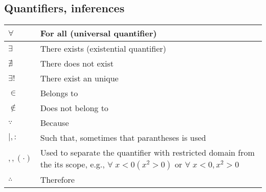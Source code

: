 \documentclass{article}
\begin{document}
\subsection{Quantifiers, inferences}
\begin{xltabular}{\textwidth}{XX}
    \(\forall\) & For all (universal quantifier) \cite{grahamConcreteMathematicsFoundation1989}\\ \hline
    \(\exists\) & There exists (existential quantifier) \cite{grahamConcreteMathematicsFoundation1989}\\ \hline
    \(\nexists\) & There does not exist \cite{grahamConcreteMathematicsFoundation1989}\\ \hline
    \(\exists!\) & There exist an unique \cite{grahamConcreteMathematicsFoundation1989}\\ \hline
    \(\in\) & Belongs to \cite{grahamConcreteMathematicsFoundation1989}\\ \hline
    \(\not\in\) & Does not belong to \cite{grahamConcreteMathematicsFoundation1989}\\ \hline
    \(\because\) & Because \cite{grahamConcreteMathematicsFoundation1989}\\ \hline
    \(\mid, :\) & Such that, sometimes that parantheses is used \cite{grahamConcreteMathematicsFoundation1989}\\ \hline
    \(, , \left( \cdot \right)\) & Used to separate the quantifier with restricted domain from the its scope, e.g., \(\forall \; x < 0 \left( x^{2} > 0 \right)\) or \(\forall \; x < 0, x^{2} > 0\) \cite{grahamConcreteMathematicsFoundation1989}\\ \hline
    \(\therefore\) & Therefore \cite{grahamConcreteMathematicsFoundation1989}\\
\end{xltabular}
\end{document}
